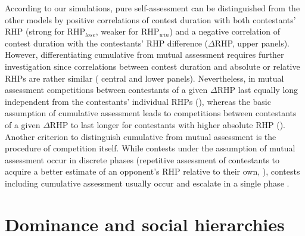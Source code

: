 According to our simulations, pure self-assessment can be distinguished from the other models by positive correlations of contest duration with both contestants' RHP (strong for RHP$_{lose}$, weaker for RHP$_{win}$) and a negative correlation of contest duration with the contestants' RHP difference ($\Delta$RHP,  upper panels). However, differentiating cumulative from mutual assessment requires further investigation since correlations between contest duration and absolute or relative RHPs are rather similar ( central and lower panels). Nevertheless, in mutual assessment competitions between contestants of a given $\Delta$RHP last equally long independent from the contestants' individual RHPs (), whereas the basic assumption of cumulative assessment leads to competitions between contestants of a given $\Delta$RHP to last longer for contestants with higher absolute RHP (). Another criterion to distinguish cumulative from mutual assessment is the procedure of competition itself. While contests under the assumption of mutual assessment occur in discrete phases (repetitive assessment of contestants to acquire a better estimate of an opponent's RHP relative to their own, \citealp{EnquistLeimar1987, Enquist1990}), contests including cumulative assessment usually occur and escalate in a single phase \citep{Payne1998}. 

\section{Dominance and social hierarchies}

